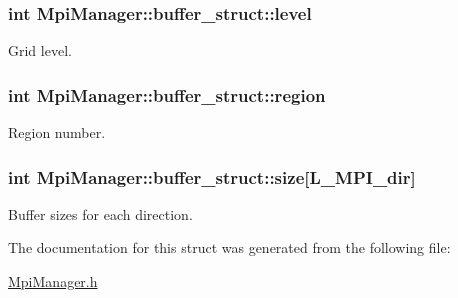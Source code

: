 \subsubsection[{\texorpdfstring{level}{level}}]{\setlength{\rightskip}{0pt plus 5cm}int Mpi\+Manager\+::buffer\+\_\+struct\+::level}\hypertarget{struct_mpi_manager_1_1buffer__struct_adc6bb3b15665e3fb5834e6134395e1f9}{}\label{struct_mpi_manager_1_1buffer__struct_adc6bb3b15665e3fb5834e6134395e1f9}


Grid level. 

\subsubsection[{\texorpdfstring{region}{region}}]{\setlength{\rightskip}{0pt plus 5cm}int Mpi\+Manager\+::buffer\+\_\+struct\+::region}\hypertarget{struct_mpi_manager_1_1buffer__struct_a81730a85a03630880e8c378fcb8d3298}{}\label{struct_mpi_manager_1_1buffer__struct_a81730a85a03630880e8c378fcb8d3298}


Region number. 

\subsubsection[{\texorpdfstring{size}{size}}]{\setlength{\rightskip}{0pt plus 5cm}int Mpi\+Manager\+::buffer\+\_\+struct\+::size\mbox{[}{\bf L\+\_\+\+M\+P\+I\+\_\+dir}\mbox{]}}\hypertarget{struct_mpi_manager_1_1buffer__struct_aea0037fce808f601ae9c1e48926dbd0e}{}\label{struct_mpi_manager_1_1buffer__struct_aea0037fce808f601ae9c1e48926dbd0e}


Buffer sizes for each direction. 



The documentation for this struct was generated from the following file\+:\begin{DoxyCompactItemize}
\item 
\hyperlink{_mpi_manager_8h}{Mpi\+Manager.\+h}\end{DoxyCompactItemize}
